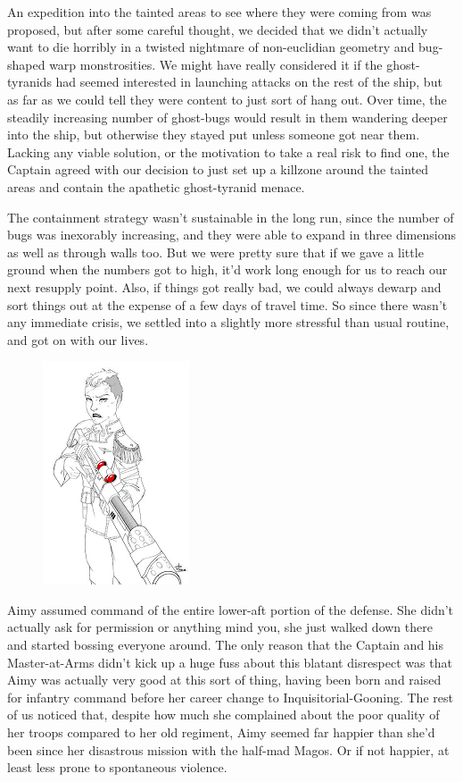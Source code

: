 An expedition into the tainted areas to see where they were coming from was proposed, but after some careful thought, we decided that we didn't actually want to die horribly in a twisted nightmare of non-euclidian geometry and bug-shaped warp monstrosities. 
We might have really considered it if the ghost-tyranids had seemed interested in launching attacks on the rest of the ship, but as far as we could tell they were content to just sort of hang out. 
Over time, the steadily increasing number of ghost-bugs would result in them wandering deeper into the ship, but otherwise they stayed put unless someone got near them. 
Lacking any viable solution, or the motivation to take a real risk to find one, the Captain agreed with our decision to just set up a killzone around the tainted areas and contain the apathetic ghost-tyranid menace.

The containment strategy wasn't sustainable in the long run, since the number of bugs was inexorably increasing, and they were able to expand in three dimensions as well as through walls too. 
But we were pretty sure that if we gave a little ground when the numbers got to high, it'd work long enough for us to reach our next resupply point. 
Also, if things got really bad, we could always dewarp and sort things out at the expense of a few days of travel time. 
So since there wasn't any immediate crisis, we settled into a slightly more stressful than usual routine, and got on with our lives.

\begin{figure}
	\begin{center}
		\includegraphics[width=\figwidth]{pics/15/15.png}
	\end{center}
\end{figure}
Aimy assumed command of the entire lower-aft portion of the defense. 
She didn't actually ask for permission or anything mind you, she just walked down there and started bossing everyone around. 
The only reason that the Captain and his Master-at-Arms didn't kick up a huge fuss about this blatant disrespect was that Aimy was actually very good at this sort of thing, having been born and raised for infantry command before her career change to Inquisitorial-Gooning. 
The rest of us noticed that, despite how much she complained about the poor quality of her troops compared to her old regiment, Aimy seemed far happier than she'd been since her disastrous mission with the half-mad Magos. 
Or if not happier, at least less prone to spontaneous violence.

